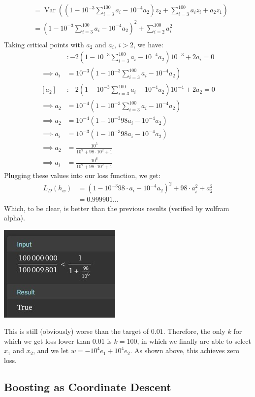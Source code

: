 \documentclass{amsart}
\DeclareMathOperator{\Var}{Var}  %
\theoremstyle{definition}
\begin{document}
\begin{enumerate}[(a)]
\begin{enumerate}[i.]
\begin{align*}
          &= \Var\left(\left(1 - 10^{-3}\sum_{i = 3}^{100} a_i - 10^{-4} a_2\right)z_2 + \sum_{i = 3}^{100} a_i z_i + a_2 z_1\right)\\
          &= \left(1 - 10^{-3}\sum_{i = 3}^{100} a_i - 10^{-4} a_2\right)^2 + \sum_{i = 2}^{100} a_i^2\\
        \end{align*}
        Taking critical points with $a_2$ and $a_i$, $i > 2$, we have:
        \begin{align*}
          [a_i]&: -2 \left(1 - 10^{-3}\sum_{i = 3}^{100} a_i - 10^{-4} a_2\right) 10^{-3} + 2 a_i = 0\\
          \implies a_i &= 10^{-3} \left(1 - 10^{-3}\sum_{i = 3}^{100} a_i - 10^{-4} a_2\right)\\
          [a_2]&: -2 \left(1 - 10^{-3}\sum_{i = 3}^{100} a_i - 10^{-4} a_2\right) 10^{-4} + 2 a_2 = 0\\
          \implies a_2 &= 10^{-4} \left(1 - 10^{-3}\sum_{i = 3}^{100} a_i - 10^{-4} a_2\right)\\
          \implies a_2 &= 10^{-4}\left(1- 10^{-3}98 a_i - 10^{-4} a_2\right)\\
          \implies a_i &= 10^{-3}\left(1 - 10^{-3}98 a_i - 10^{-4} a_2\right)\\
          \implies a_2 &= \frac{10^5}{10^9 + 98 \cdot 10^2 + 1}\\
          \implies a_i &= \frac{10^6}{10^9 + 98 \cdot 10^2 + 1}
        \end{align*}
        Plugging these values into our loss function, we get:
        \begin{align*}
          L_D(h_w)&= \left(1 - 10^{-3}98\cdot a_i - 10^{-4} a_2\right)^2 + 98 \cdot a_i^2 + a_2^2\\
          &= 0.999901... 
        \end{align*}
        Which, to be clear, is better than the previous results (verified by wolfram alpha).

        \includegraphics{Screenshot 2025-02-25 215956.jpg}

        This is still (obviously) worse than the target of $0.01$. 
        Therefore, the only $k$ for which we get loss lower than $0.01$ is $k = 100$, in which we finally are able to select $x_1$ and $x_2$, and we let $w = -10^4e_1 + 10^4 e_2$.
        As shown above, this achieves zero loss.
    \end{enumerate}
\end{enumerate}
\subsection{Boosting as Coordinate Descent}
\end{document}
